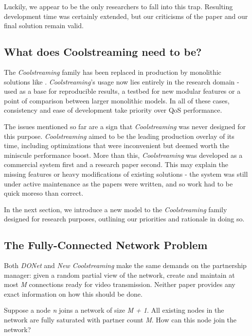 \documentclass[12pt,a4paper]{article}
\begin{document}
Luckily, we appear to be the only researchers to fall into this trap. Resulting development time was certainly extended, but our criticisms of the paper and our final solution remain valid.

\subsection{What does Coolstreaming need to be?} \label{problems:what}
The \textit{Coolstreaming} family has been replaced in production by monolithic solutions like . \textit{Coolstreaming}'s usage now lies entirely in the research domain - used as a base for reproducible results, a testbed for new modular features or a point of comparison between larger monolithic models. In all of these cases, consistency and ease of development take priority over QoS performance.

The issues mentioned so far are a sign that \textit{Coolstreaming} was never designed for this purpose. \textit{Coolstreaming} aimed to be the leading production overlay of its time, including optimizations that were inconvenient but deemed worth the miniscule performance boost. More than this, \textit{Coolstreaming} was developed as a commercial system first and a research paper second. This may explain the missing features or heavy modifications of existing solutions - the system was still under active maintenance as the papers were written, and so work had to be quick moreso than correct.

In the next section, we introduce a new model to the \textit{Coolstreaming} family designed for research purposes, outlining our priorities and rationale in doing so.

\subsection{The Fully-Connected Network Problem} \label{problems:fcn}
Both \textit{DONet} and \textit{New Coolstreaming} make the same demands on the partnership manager: given a random partial view of the network, create and maintain at most \textit{M} connections ready for video transmission. Neither paper provides any exact information on how this should be done.

Suppose a node \textit{n} joins a network of size \textit{M + 1}. All existing nodes in the network are fully saturated with partner count \textit{M}. How can this node join the network?
\end{document}
